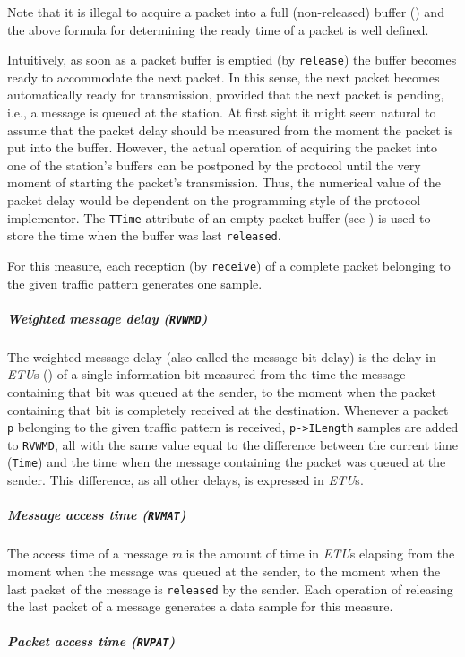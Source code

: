 Note that it is illegal to acquire a packet into a full (non-released) buffer
()
and the above formula for determining the ready time of a packet is well
defined.

Intuitively, as soon as a packet buffer is emptied
(by {\tt release}) the buffer becomes ready to accommodate the next packet.
In this sense, the next packet becomes automatically ready for transmission,
provided that the next packet is pending, i.e.,
a message is queued at the station.
At first sight it might seem natural to assume that the packet delay should be
measured from the moment the packet is put into the buffer.
However, the actual operation of acquiring the packet into one of the station's
buffers can be postponed by the protocol until the very moment of starting
the packet's transmission.
Thus, the numerical value of the packet delay would be dependent on the
programming style of the protocol implementor.
The {\tt TTime} attribute of an empty packet buffer
(see ) is used to store the time when the buffer
was last {\tt released}.

For this measure, each reception (by {\tt receive}) of a complete packet
belonging to the given traffic pattern generates one sample.

\subparagraph*{Weighted message delay ({\tt RVWMD})}

The weighted message delay (also called the message bit delay)
is the delay
in {\em ETU\/}s ()
of a single information bit measured from the time the message
containing that bit was queued at the sender, to the moment when the packet
containing that bit is completely received at the destination.
Whenever a packet {\tt p} belonging to the given traffic pattern is received,
{\tt p->ILength} samples are added to {\tt RVWMD}, all with the same value
equal to the difference between the current time ({\tt Time})
and the time when the message containing the packet was queued at the sender.
This difference, as all other delays, is expressed in {\em ETU\/}s.

\subparagraph*{Message access time ({\tt RVMAT})}

The access time of a message {\em m\/} is the amount of time in {\em ETU\/}s
elapsing from the moment when
the message was queued at the sender, to the moment when
the last packet of the message is {\tt released} by the sender.
Each operation of releasing the last packet of a message generates a data
sample for this measure.

\subparagraph*{Packet access time ({\tt RVPAT})}

